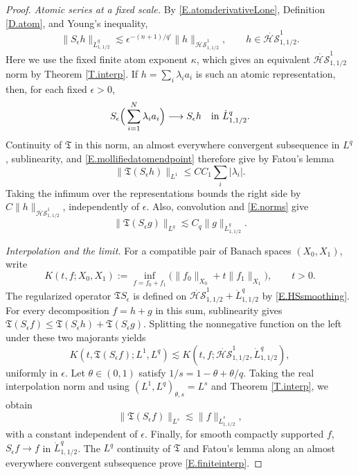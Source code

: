 \documentclass[10pt,a4paper]{amsart}
\numberwithin{equation}{section}
\newcommand{\HS}{\dot{\mathcal{HS}}^{1}_{1,1/2}}
\begin{document}
\begin{proof}
\noindent\emph{Atomic series at a fixed scale.} By \eqref{E.atomderivativeLone},
Definition \ref{D.atom}, and Young's inequality,
\begin{equation}\label{E.HSsmoothing}
 \|S_\epsilon h\|_{\dot L^q_{1,1/2}}
 \lesssim\epsilon^{-(n+1)/q'}\|h\|_{\HS},\qquad h\in\HS.
\end{equation}
Here we use the fixed finite atom exponent $\kappa$, which gives an
equivalent $\HS$ norm by Theorem \ref{T.interp}. If
$h=\sum_i\lambda_i a_i$ is such an atomic representation, then, for each
fixed $\epsilon>0$,
\[
 S_\epsilon\Big(\sum_{i=1}^N\lambda_i a_i\Big)
 \longrightarrow S_\epsilon h\quad\hbox{in }\dot L^q_{1,1/2}.
\]
Continuity of $\mathfrak T$ in this norm, an almost everywhere convergent
subsequence in $L^q$, sublinearity, and \eqref{E.mollifiedatomendpoint}
therefore give by Fatou's lemma
\begin{equation}\label{E.regularizedendpoint}
 \|\mathfrak T(S_\epsilon h)\|_{L^1}
 \le C C_1\sum_i|\lambda_i|.
\end{equation}
Taking the infimum over the representations bounds the right side by
$C\|h\|_{\HS}$, independently of $\epsilon$.
Also, convolution and \eqref{E.norms} give
\[
 \|\mathfrak T(S_\epsilon g)\|_{L^q}
 \lesssim C_q\|g\|_{\dot L^q_{1,1/2}}.
\]
\medskip

\noindent\emph{Interpolation and the limit.} For a compatible pair of Banach spaces
$(X_0,X_1)$, write
\[
 K(t,f;X_0,X_1):=\inf_{f=f_0+f_1}
       \big(\|f_0\|_{X_0}+t\|f_1\|_{X_1}\big),\qquad t>0.
\]
The regularized operator $\mathfrak T S_\epsilon$ is defined on
$\HS+\dot L^q_{1,1/2}$ by \eqref{E.HSsmoothing}. For every decomposition
$f=h+g$ in this sum, sublinearity gives
$\mathfrak T(S_\epsilon f)\le\mathfrak T(S_\epsilon h)+
\mathfrak T(S_\epsilon g)$. Splitting the nonnegative function on the left
under these two majorants yields
\[
 K(t,\mathfrak T(S_\epsilon f);L^1,L^q)
 \lesssim K(t,f;\HS,\dot L^q_{1,1/2}),
\]
uniformly in $\epsilon$. Let $\theta\in(0,1)$ satisfy
$1/s=1-\theta+\theta/q$. Taking the real interpolation norm and using
$(L^1,L^q)_{\theta,s}=L^s$ and Theorem \ref{T.interp}, we obtain
\[
 \|\mathfrak T(S_\epsilon f)\|_{L^s}
 \lesssim\|f\|_{\dot L^s_{1,1/2}},
\]
with a constant independent of $\epsilon$. Finally, for smooth compactly
supported $f$, $S_\epsilon f\to f$ in $\dot L^q_{1,1/2}$. The $L^q$
continuity of $\mathfrak T$ and Fatou's lemma along an almost everywhere
convergent subsequence prove \eqref{E.finiteinterp}.
\end{proof}
\end{document}
